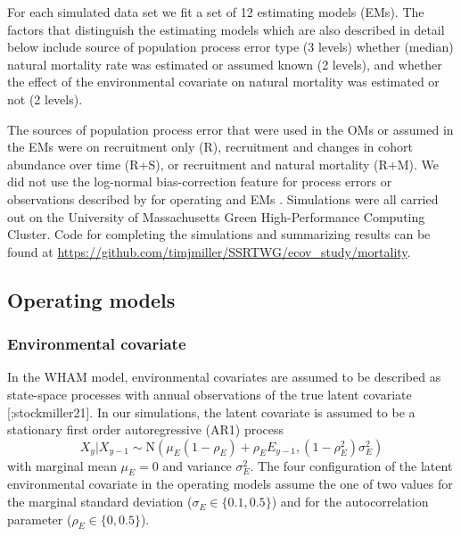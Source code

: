 \documentclass[
  12pt,
]{article}
\begin{document}
For each simulated data set we fit a set of 12 estimating models (EMs). The factors that distinguish the estimating models which are also described in detail below include source of population process error type (3 levels) whether (median) natural mortality rate was estimated or assumed known (2 levels), and whether the effect of the environmental covariate on natural mortality was estimated or not (2 levels).

The sources of population process error that were used in the OMs or assumed in the EMs were on recruitment only (R), recruitment and changes in cohort abundance over time (R+S), or recruitment and natural mortality (R+M). We did not use the log-normal bias-correction feature for process errors or observations described by \citet{stockmiller21} for operating and EMs \citep{lietal_inreview}. Simulations were all carried out on the University of Massachusetts Green High-Performance Computing Cluster. Code for completing the simulations and summarizing results can be found at \url{https://github.com/timjmiller/SSRTWG/ecov_study/mortality}.

\hypertarget{operating-models}{%
\subsection*{Operating models}\label{operating-models}}

\hypertarget{environmental-covariate}{%
\subsubsection*{Environmental covariate}\label{environmental-covariate}}

In the WHAM model, environmental covariates are assumed to be described as state-space processes with annual observations of the true latent covariate {[}\citet{milleretal16};stockmiller21{]}. In our simulations, the latent covariate is assumed to be a stationary first order autoregressive (AR1) process
\[
X_y|X_{y-1} \sim \text{N}\left(\mu_E\left(1-\rho_E\right) + \rho_E E_{y-1}, \left(1-\rho_E^2\right)\sigma^2_E\right)
\]
with marginal mean \(\mu_E=0\) and variance \(\sigma^2_E\). The four configuration of the latent environmental covariate in the operating models assume the one of two values for the marginal standard deviation (\(\sigma_E \in \{0.1, 0.5\}\)) and for the autocorrelation parameter (\(\rho_E \in \{0, 0.5\}\)).
\end{document}
